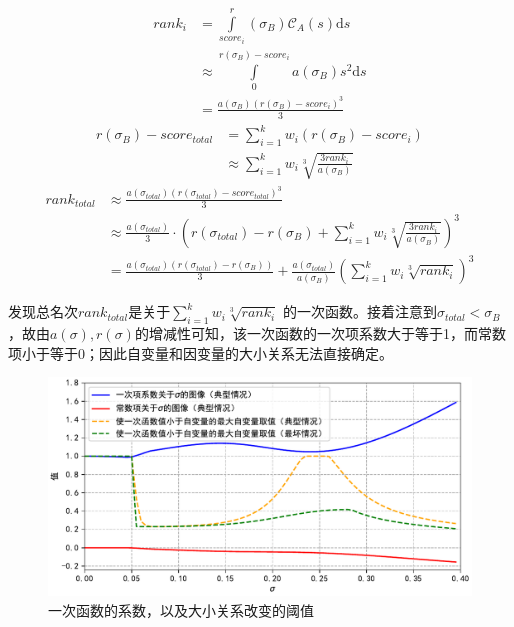             \begin{align*}
                \textit{rank}_i
                &=\int\limits_{\textit{score}_i}^r(\sigma_B) \mathcal{C}_A(s) \mathrm{d}s \\
                &\approx\int\limits_0^{r(\sigma_B)-\textit{score}_i} a(\sigma_B) s^2 \mathrm{d}s \\
                &=\frac{a(\sigma_B)\left(r(\sigma_B)-\textit{score}_i\right)^3}3
            \end{align*}
            \begin{align*}
                r(\sigma_B)-\textit{score}_{\textit{total}}
                &=\sum\limits_{i=1}^k w_i\left(r(\sigma_B)-\textit{score}_i\right) \\
                &\approx\sum\limits_{i=1}^k w_i\sqrt[3]{\frac{3\textit{rank}_i}{a(\sigma_B)}}
            \end{align*}
            \begin{align*}
                \textit{rank}_{\textit{total}}
                &\approx\frac{a(\sigma_{\textit{total}})(r(\sigma_{\textit{total}})-\textit{score}_{\textit{total}})^3}3 \\
                &\approx\frac{a(\sigma_{\textit{total}})}{3}\cdot\left(r(\sigma_{\textit{total}})-r(\sigma_B)+\sum\limits_{i=1}^k w_i\sqrt[3]{\frac{3\textit{rank}_i}{a(\sigma_B)}}\right)^3 \\
                &=\frac{a(\sigma_{\textit{total}})\left(r(\sigma_{\textit{total}})-r(\sigma_B)\right)}{3}+\frac{a(\sigma_{\textit{total}})}{a(\sigma_B)}\left(\sum\limits_{i=1}^k w_i\sqrt[3]{\textit{rank}_i}\right)^3
            \end{align*}

            发现总名次$\textit{rank}_{\textit{total}}$是关于$\sum_{i=1}^k w_i\sqrt[3]{\textit{rank}_i}$ 的一次函数。接着注意到$\sigma_{\textit{total}}<\sigma_B$，故由$a(\sigma),r(\sigma)$的增减性可知，该一次函数的一次项系数大于等于1，而常数项小于等于0；因此自变量和因变量的大小关系无法直接确定。

            \begin{figure}[htbp]
                \centering
                \includegraphics[width=\textwidth]{fig/plottingKandB.pdf}
                \caption{一次函数的系数，以及大小关系改变的阈值}
                \label{fig:plottingKandB}
            \end{figure}

